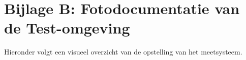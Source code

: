 \appendix
\section*{Bijlage B: Fotodocumentatie van de Test-omgeving}

Hieronder volgt een visueel overzicht van de opstelling van het meetsysteem.

\begin{figure}[h!]
    \centering
    \begin{minipage}{0.48\textwidth}
        \centering
    \end{minipage}
    \hspace{0.02\textwidth}
    \begin{minipage}{0.48\textwidth}
        \centering
\end{minipage}
\end{figure}
